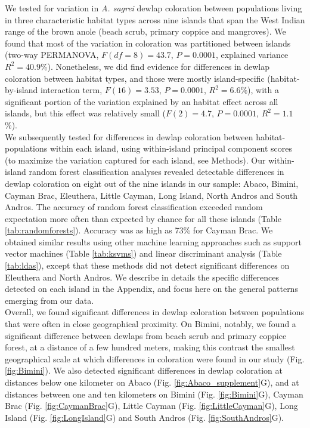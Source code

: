 We tested for variation in \textit{A. sagrei} dewlap coloration between populations living in three characteristic habitat types across nine islands that span the West Indian range of the brown anole (beach scrub, primary coppice and mangroves). We found that most of the variation in coloration was partitioned between islands (two-way PERMANOVA, $F(df = 8) = 43.7$, $P = 0.0001$, explained variance $R^2 = 40.9$\%). Nonetheless, we did find evidence for differences in dewlap coloration between habitat types, and those were mostly island-specific (habitat-by-island interaction term, $F(16) = 3.53$, $P = 0.0001$, $R^2 = 6.6$\%), with a significant portion of the variation explained by an habitat effect across all islands, but this effect was relatively small ($F(2) = 4.7$, $P = 0.0001$, $R^2 = 1.1$\%).\\

We subsequently tested for differences in dewlap coloration between habitat-populations within each island, using within-island principal component scores (to maximize the variation captured for each island, see Methods). Our within-island random forest classification analyses revealed detectable differences in dewlap coloration on eight out of the nine islands in our sample: Abaco, Bimini, Cayman Brac, Eleuthera, Little Cayman, Long Island, North Andros and South Andros. The accuracy of random forest classification exceeded random expectation more often than expected by chance for all these islands (Table \ref{tab:randomforests}). Accuracy was as high as 73\% for Cayman Brac. We obtained similar results using other machine learning approaches such as support vector machines (Table \ref{tab:ksvms}) and linear discriminant analysis (Table \ref{tab:ldas}), except that these methods did not detect significant differences on Eleuthera and North Andros. We describe in details the specific differences detected on each island in the Appendix, and focus here on the general patterns emerging from our data.\\

Overall, we found significant differences in dewlap coloration between populations that were often in close geographical proximity. On Bimini, notably, we found a significant difference between dewlaps from beach scrub and primary coppice forest, at a distance of a few hundred meters, making this contrast the smallest geographical scale at which differences in coloration were found in our study (Fig. \ref{fig:Bimini}). We also detected significant differences in dewlap coloration at distances below one kilometer on Abaco (Fig. \ref{fig:Abaco_supplement}G), and at distances between one and ten kilometers on Bimini (Fig. \ref{fig:Bimini}G), Cayman Brac (Fig. \ref{fig:CaymanBrac}G), Little Cayman (Fig. \ref{fig:LittleCayman}G), Long Island (Fig. \ref{fig:LongIsland}G) and South Andros (Fig. \ref{fig:SouthAndros}G).\\

